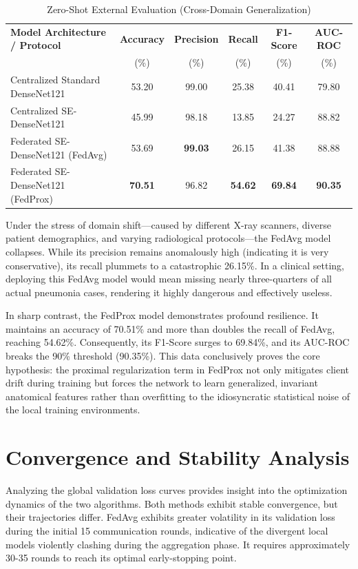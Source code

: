 \documentclass[12pt,a4paper]{report}
\begin{document}
\begin{table}[H]
\centering
\caption{Zero-Shot External Evaluation (Cross-Domain Generalization)}
\label{tab:external_results}
\begin{tabular}{lccccc}
\toprule
\textbf{Model Architecture / Protocol} & \textbf{Accuracy} & \textbf{Precision} & \textbf{Recall} & \textbf{F1-Score} & \textbf{AUC-ROC}\\
 & (\%) & (\%) & (\%) & (\%) & (\%)\\
\midrule
Centralized Standard DenseNet121 & 53.20 & 99.00 & 25.38 & 40.41 & 79.80\\
Centralized SE-DenseNet121 & 45.99 & 98.18 & 13.85 & 24.27 & 88.82\\
Federated SE-DenseNet121 (FedAvg) & 53.69 & \textbf{99.03} & 26.15 & 41.38 & 88.88\\
Federated SE-DenseNet121 (FedProx) & \textbf{70.51} & 96.82 & \textbf{54.62} & \textbf{69.84} & \textbf{90.35}\\
\bottomrule
\end{tabular}
\end{table}

Under the stress of domain shift---caused by different X-ray scanners, diverse patient demographics, and varying radiological protocols---the FedAvg model collapses. While its precision remains anomalously high (indicating it is very conservative), its recall plummets to a catastrophic 26.15\%. In a clinical setting, deploying this FedAvg model would mean missing nearly three-quarters of all actual pneumonia cases, rendering it highly dangerous and effectively useless. 

In sharp contrast, the FedProx model demonstrates profound resilience. It maintains an accuracy of 70.51\% and more than doubles the recall of FedAvg, reaching 54.62\%. Consequently, its F1-Score surges to 69.84\%, and its AUC-ROC breaks the 90\% threshold (90.35\%). This data conclusively proves the core hypothesis: the proximal regularization term in FedProx not only mitigates client drift during training but forces the network to learn generalized, invariant anatomical features rather than overfitting to the idiosyncratic statistical noise of the local training environments.

\section{Convergence and Stability Analysis}

Analyzing the global validation loss curves provides insight into the optimization dynamics of the two algorithms. Both methods exhibit stable convergence, but their trajectories differ. FedAvg exhibits greater volatility in its validation loss during the initial 15 communication rounds, indicative of the divergent local models violently clashing during the aggregation phase. It requires approximately 30-35 rounds to reach its optimal early-stopping point.
\end{document}
